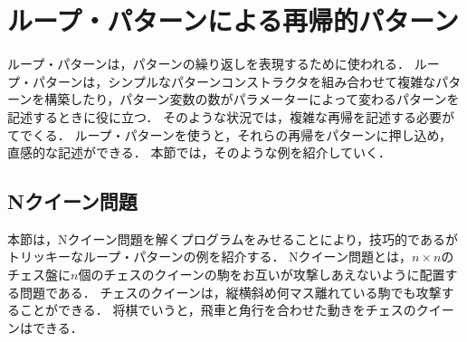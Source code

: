 \section{ループ・パターンによる再帰的パターン}\label{pmo-loop}

ループ・パターンは，パターンの繰り返しを表現するために使われる．
ループ・パターンは，シンプルなパターンコンストラクタを組み合わせて複雑なパターンを構築したり，パターン変数の数がパラメーターによって変わるパターンを記述するときに役に立つ．
そのような状況では，複雑な再帰を記述する必要がてでくる．
ループ・パターンを使うと，それらの再帰をパターンに押し込め，直感的な記述ができる．
本節では，そのような例を紹介していく．

\subsection{Nクイーン問題}\label{pmo-loop-nqueen}

本節は，Nクイーン問題を解くプログラムをみせることにより，技巧的であるがトリッキーなループ・パターンの例を紹介する．
Nクイーン問題とは，$n \times n$のチェス盤に$n$個のチェスのクイーンの駒をお互いが攻撃しあえないように配置する問題である．
チェスのクイーンは，縦横斜め何マス離れている駒でも攻撃することができる．
将棋でいうと，飛車と角行を合わせた動きをチェスのクイーンはできる．


